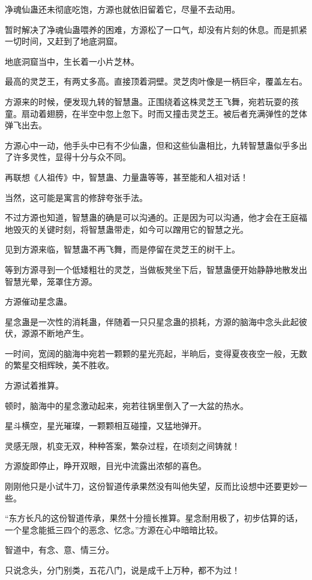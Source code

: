 \begin{this_body}
净魂仙蛊还未彻底吃饱，方源也就依旧留着它，尽量不去动用。

暂时解决了净魂仙蛊喂养的困难，方源松了一口气，却没有片刻的休息。而是抓紧一切时间，又赶到了地底洞窟。

地底洞窟当中，生长着一小片芝林。

最高的灵芝王，有两丈多高。直接顶着洞壁。灵芝肉叶像是一柄巨伞，覆盖左右。

方源来的时候，便发现九转的智慧蛊。正围绕着这株灵芝王飞舞，宛若玩耍的孩童。扇动着翅膀，在半空中忽上忽下。时而又撞击灵芝王。被后者充满弹性的芝体弹飞出去。

方源心中一动，他手头中已有不少仙蛊，但和这些仙蛊相比，九转智慧蛊似乎多出了许多灵性，显得十分与众不同。

再联想《人祖传》中，智慧蛊、力量蛊等等，甚至能和人祖对话！

当然，这可能是寓言的修辞夸张手法。

不过方源也知道，智慧蛊的确是可以沟通的。正是因为可以沟通，他才会在王庭福地毁灭的关键时刻，将智慧蛊带走，如今可以蹭用它的智慧之光。

见到方源来临，智慧蛊不再飞舞，而是停留在灵芝王的树干上。

等到方源寻到一个低矮粗壮的灵芝，当做板凳坐下后，智慧蛊便开始静静地散发出智慧光晕，笼罩住方源。

方源催动星念蛊。

星念蛊是一次性的消耗蛊，伴随着一只只星念蛊的损耗，方源的脑海中念头此起彼伏，源源不断地产生。

一时间，宽阔的脑海中宛若一颗颗的星光亮起，半晌后，变得夏夜夜空一般，无数的繁星交相辉映，美不胜收。

方源试着推算。

顿时，脑海中的星念激动起来，宛若往锅里倒入了一大盆的热水。

星斗横空，星光璀璨，一颗颗相互碰撞，又猛地弹开。

灵感无限，机变无双，种种答案，繁杂过程，在顷刻之间铸就！

方源旋即停止，睁开双眼，目光中流露出浓郁的喜色。

刚刚他只是小试牛刀，这份智道传承果然没有叫他失望，反而比设想中还要更妙一些。

“东方长凡的这份智道传承，果然十分擅长推算。星念耐用极了，初步估算的话，一个星念能抵三四个的恶念、忆念。”方源在心中暗暗比较。

智道中，有念、意、情三分。

只说念头，分门别类，五花八门，说是成千上万种，都不为过！


\end{this_body}
